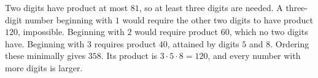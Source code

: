 Two digits have product at most $81$, so at least three digits are needed. A three-digit number beginning with $1$ would require the other two digits to have product $120$, impossible. Beginning with $2$ would require product $60$, which no two digits have. Beginning with $3$ requires product $40$, attained by digits $5$ and $8$. Ordering these minimally gives $\boxed{358}$. Its product is $3\cdot5\cdot8=120$, and every number with more digits is larger.
